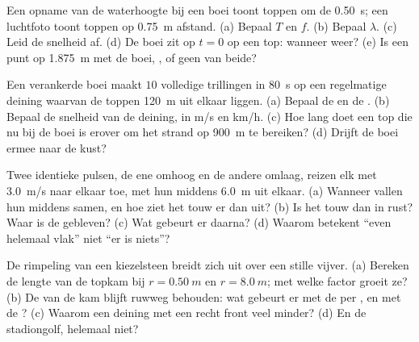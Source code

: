 \begin{exercise}[$\star\star\star$]\label{exo:g12:mechanical-waves:12}
Een opname van de waterhoogte bij een boei toont toppen om de
\qty{0.50}{s}; een luchtfoto toont toppen op \qty{0.75}{m} afstand.
(a) Bepaal $T$ en $f$. (b) Bepaal $\lambda$. (c) Leid de snelheid af.
(d) De boei zit op $t = 0$ op een top: wanneer weer? (e) Is een punt op
\qty{1.875}{m}  met de boei, , of geen van beide?
\end{exercise}

\begin{exercise}[$\star\star\star$]\label{exo:g12:mechanical-waves:13}
Een verankerde boei maakt $10$ volledige trillingen in \qty{80}{s} op een
regelmatige deining waarvan de toppen \qty{120}{m} uit elkaar liggen.
(a) Bepaal de  en de . (b) Bepaal de snelheid van de
deining, in \unit{m/s} en \unit{km/h}. (c) Hoe lang doet een top die nu
bij de boei is erover om het strand op \qty{900}{m} te bereiken? (d)
Drijft de boei ermee naar de kust?
\end{exercise}

\begin{exercise}[$\star\star\star$]\label{exo:g12:mechanical-waves:14}
Twee identieke pulsen, de ene omhoog en de andere omlaag, reizen elk met
\qty{3.0}{m/s} naar elkaar toe, met hun middens \qty{6.0}{m} uit elkaar.
(a) Wanneer vallen hun middens samen, en hoe ziet het touw er dan uit?
(b) Is het touw dan in rust? Waar is de  gebleven? (c) Wat gebeurt
er daarna? (d) Waarom betekent ``even helemaal vlak'' niet ``er is
niets''?
\end{exercise}

\begin{exercise}[$\star\star\star$]\label{exo:g12:mechanical-waves:15}
De rimpeling van een kiezelsteen breidt zich uit over een stille vijver.
(a) Bereken de lengte van de topkam bij $r = \qty{0.50}{m}$ en
$r = \qty{8.0}{m}$; met welke factor groeit ze? (b) De  van de kam
blijft ruwweg behouden: wat gebeurt er met de  per , en met de
? (c) Waarom  een deining met een recht front veel
minder? (d) En de stadiongolf, helemaal niet?
\end{exercise}

